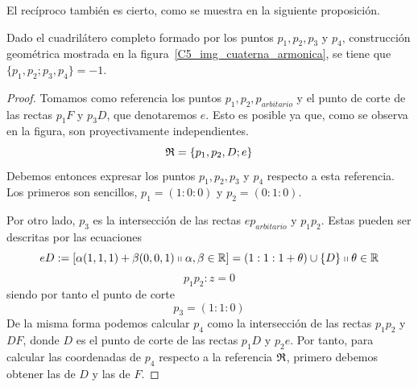 El recíproco también es cierto, como se muestra en la siguiente proposición.
\begin{prop}
	Dado el cuadrilátero completo formado por los puntos $p_1,p_2,p_3$ y $p_4$, construcción geométrica mostrada en la figura~\ref{C5_img_cuaterna_armonica}, se tiene que $\{p_1,p_2;p_3,p_4\}=-1$.
	
\end{prop}
\begin{proof}
	Tomamos como referencia los puntos $p_1,p_2,p_{arbitario}$ y el punto de corte de las rectas $p_1F$ y $p_3D$, que denotaremos $e$. Esto es posible ya que, como se observa en la figura, son proyectivamente independientes.
	\[\mathfrak{R}=\{p_1,p_2,D;e\}\]
	Debemos entonces expresar los puntos $p_1,p_2,p_3$ y $p_4$ respecto a esta referencia. Los primeros son sencillos, $p_1=(1:0:0)$ y $p_2=(0:1:0)$. 
	
	Por otro lado, $p_3$ es la intersección de las rectas $ep_{arbitario}$ y $p_1p_2$. Estas pueden ser descritas por las ecuaciones
	\begin{equation*}
		eD:=\left [ \alpha(1,1,1)+\beta(0,0,1)\shortparallel \alpha,\beta\in \mathbb{R} \right ]=(1:1:1+\theta)\cup\{D\}\shortparallel\theta\in\mathbb{R}
	\end{equation*}
	\begin{equation*}
		p_1p_2:z=0
	\end{equation*}
	siendo por tanto el punto de corte 
	\[p_3=(1:1:0)\]
	De la misma forma podemos calcular $p_4$ como la intersección de las rectas $p_1p_2$ y $DF$, donde $D$ es el punto de corte de las rectas $p_1D$ y $p_2e$. Por tanto, para calcular las coordenadas de $p_4$ respecto a la referencia $\mathfrak{R}$, primero debemos obtener las de $D$ y las de $F$.
	

\end{proof}
